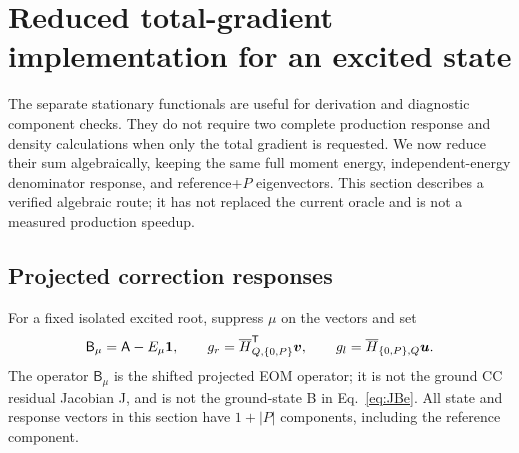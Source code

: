 \section{Reduced total-gradient implementation for an excited state}
\label{sec:lean}
The separate stationary functionals are useful for derivation and diagnostic
component checks. They do not require two complete production response and
density calculations when only the total gradient is requested. We now
reduce their sum algebraically, keeping the same full moment energy,
independent-energy denominator response, and reference+$P$ eigenvectors.
This section describes a verified algebraic route; it has not replaced the
current oracle and is not a measured production speedup.

\subsection{Projected correction responses}
For a fixed isolated excited root, suppress $\mu$ on the vectors and set
\begin{equation}
 \mathsf B_\mu=\mathsf A-E_\mu\mathbf1,\qquad
 g_r=\overline H_{Q,\{0,P\}}^{\mathsf T}\bm v,\qquad
 g_l=\overline H_{\{0,P\},Q}\bm u.
 \label{eq:leanB}
\end{equation}
The operator $\mathsf B_\mu$ is the shifted projected EOM operator; it is
not the ground CC residual Jacobian J, and is not the ground-state B in
Eq.~\eqref{eq:JBe}. All state and response vectors in this section have
$1+|P|$ components, including the reference component.

